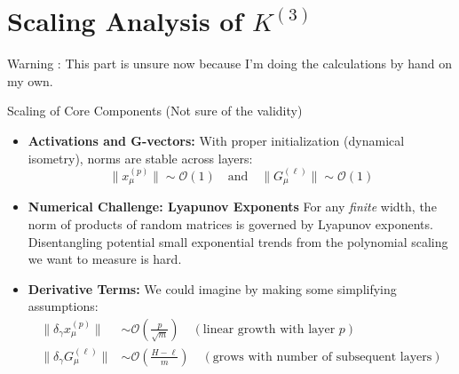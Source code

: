 \documentclass{beamer}
\newcommand{\Order}{\mathcal{O}}
\begin{document}
\section{Scaling Analysis of $K^{(3)}$}
Warning : This part is unsure now because I'm doing the calculations by hand on my own.
\begin{frame}{Scaling of Core Components (Not sure of the validity)}
\begin{itemize}
    \item \textbf{Activations and G-vectors:}
    With proper initialization (dynamical isometry), norms are stable across layers:
    \[ \|x^{(p)}_\mu\| \sim \Order(1) \quad \text{and} \quad \|G^{(\ell)}_\mu\| \sim \Order(1) \]
    
    \item \textbf{Numerical Challenge: Lyapunov Exponents}
    For any \textit{finite} width, the norm of products of random matrices is governed by Lyapunov exponents. Disentangling potential small exponential trends from the polynomial scaling we want to measure is hard.
    
    \item \textbf{Derivative Terms:}
    We could imagine by making some simplifying assumptions:
    \begin{align*}
    \|\delta_\gamma x^{(p)}_\mu\| &\sim \Order\left(\frac{p}{\sqrt{m}}\right) \quad (\text{linear growth with layer } p) \\
    \|\delta_\gamma G^{(\ell)}_\mu\| &\sim \Order\left(\frac{H-\ell}{m}\right) \quad (\text{grows with number of subsequent layers})
    \end{align*}
\end{itemize}
\end{frame}
\end{document}
